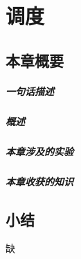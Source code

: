 \chapter{调度}\label{ch_sched}

\section{本章概要}

\paragraph{一句话描述}

\paragraph{概述}

\paragraph{本章涉及的实验}

\paragraph{本章收获的知识}

%
%
%
%
%
%
%


\section{小结}
缺